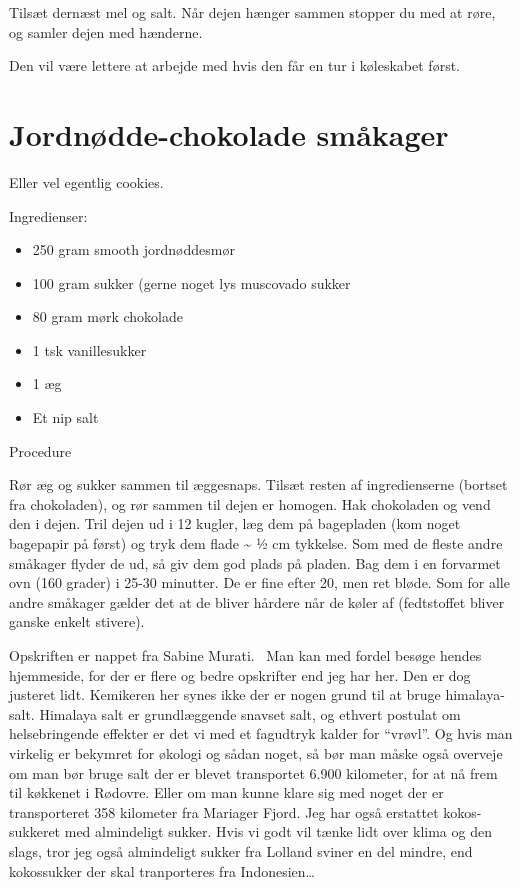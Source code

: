 \documentclass[
  letterpaper,
  DIV=11,
  numbers=noendperiod]{scrreprt}
\providecommand{\tightlist}{%
  \setlength{\itemsep}{0pt}\setlength{\parskip}{0pt}}\usepackage{longtable,booktabs,array}
\begin{document}
Tilsæt dernæst mel og salt. Når dejen hænger sammen stopper du med at
røre, og samler dejen med hænderne.

Den vil være lettere at arbejde med hvis den får en tur i køleskabet
først.

\hypertarget{jordnuxf8dde-chokolade-smuxe5kager}{%
\section{Jordnødde-chokolade
småkager}\label{jordnuxf8dde-chokolade-smuxe5kager}}

Eller vel egentlig cookies.

Ingredienser:

\begin{itemize}
\tightlist
\item
  250 gram smooth jordnøddesmør
\item
  100 gram sukker (gerne noget lys muscovado sukker
\item
  80 gram mørk chokolade
\item
  1 tsk vanillesukker
\item
  1 æg
\item
  Et nip salt
\end{itemize}

Procedure

Rør æg og sukker sammen til æggesnaps. Tilsæt resten af ingredienserne
(bortset fra chokoladen), og rør sammen til dejen er homogen. Hak
chokoladen og vend den i dejen. Tril dejen ud i 12 kugler, læg dem på
bagepladen (kom noget bagepapir på først) og tryk dem flade
\textasciitilde{} ½ cm tykkelse. Som med de fleste andre småkager flyder
de ud, så giv dem god plads på pladen. Bag dem i en forvarmet ovn (160
grader) i 25-30 minutter. De er fine efter 20, men ret bløde. Som for
alle andre småkager gælder det at de bliver hårdere når de køler af
(fedtstoffet bliver ganske enkelt stivere).

Opskriften er nappet fra Sabine Murati.~ Man kan med fordel besøge
hendes hjemmeside, for der er flere og bedre opskrifter end jeg har her.
Den er dog justeret lidt. Kemikeren her synes ikke der er nogen grund
til at bruge himalaya-salt. Himalaya salt er grundlæggende snavset salt,
og ethvert postulat om helsebringende effekter er det vi med et
fagudtryk kalder for ``vrøvl''. Og hvis man virkelig er bekymret for
økologi og sådan noget, så bør man måske også overveje om man bør bruge
salt der er blevet transportet 6.900 kilometer, for at nå frem til
køkkenet i Rødovre. Eller om man kunne klare sig med noget der er
transporteret 358 kilometer fra Mariager Fjord. Jeg har også erstattet
kokos-sukkeret med almindeligt sukker. Hvis vi godt vil tænke lidt over
klima og den slags, tror jeg også almindeligt sukker fra Lolland sviner
en del mindre, end kokossukker der skal tranporteres fra
Indonesien\ldots{}
\end{document}
